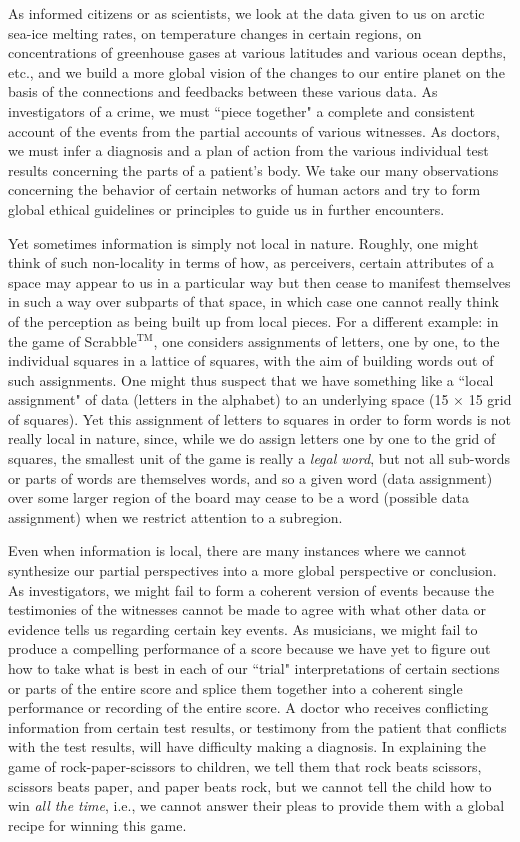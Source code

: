 \documentclass[11pt]{book}
\theoremstyle{definition}
\theoremstyle{definition}
\theoremstyle{definition}
\theoremstyle{theorem}
\theoremstyle{definition}
\begin{document}
	As informed citizens or as scientists, we look at the data given to us on arctic sea-ice melting rates, on temperature changes in certain regions, on concentrations of greenhouse gases at various latitudes and various ocean depths, etc., and we build a more global vision of the changes to our entire planet on the basis of the connections and feedbacks between these various data. As investigators of a crime, we must ``piece together" a complete and consistent account of the events from the partial accounts of various witnesses. As doctors, we must infer a diagnosis and a plan of action from the various individual test results concerning the parts of a patient's body. We take our many observations concerning the behavior of certain networks of human actors and try to form global ethical guidelines or principles to guide us in further encounters. \par 
	Yet sometimes information is simply not local in nature. Roughly, one might think of such non-locality in terms of how, as perceivers, certain attributes of a space may appear to us in a particular way but then cease to manifest themselves in such a way over subparts of that space, in which case one cannot really think of the perception as being built up from local pieces. For a different example: in the game of Scrabble$^{\text{TM}}$, one considers assignments of letters, one by one, to the individual squares in a lattice of squares, with the aim of building words out of such assignments. One might thus suspect that we have something like a ``local assignment" of data (letters in the alphabet) to an underlying space (15 $\times$ 15 grid of squares). Yet this assignment of letters to squares in order to form words is not really local in nature, since, while we do assign letters one by one to the grid of squares, the smallest unit of the game is really a \textit{legal word}, but not all sub-words or parts of words are themselves words, and so a given word (data assignment) over some larger region of the board may cease to be a word (possible data assignment) when we restrict attention to a subregion. \par  
	Even when information is local, there are many instances where we cannot synthesize our partial perspectives into a more global perspective or conclusion. As investigators, we might fail to form a coherent version of events because the testimonies of the witnesses cannot be made to agree with what other data or evidence tells us regarding certain key events. As musicians, we might fail to produce a compelling performance of a score because we have yet to figure out how to take what is best in each of our ``trial" interpretations of certain sections or parts of the entire score and splice them together into a coherent single performance or recording of the entire score. A doctor who receives conflicting information from certain test results, or testimony from the patient that conflicts with the test results, will have difficulty making a diagnosis. In explaining the game of rock-paper-scissors to children, we tell them that rock beats scissors, scissors beats paper, and paper beats rock, but we cannot tell the child how to win \textit{all the time}, i.e., we cannot answer their pleas to provide them with a global recipe for winning this game.\par 
\end{document}
